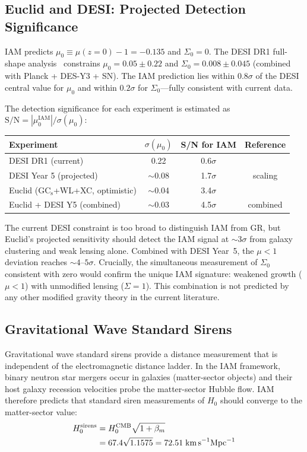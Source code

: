 \documentclass[aps,prd,twocolumn,superscriptaddress,nofootinbib]{revtex4-2}
\begin{document}
\subsection{Euclid and DESI: Projected Detection Significance}

IAM predicts $\mu_0 \equiv \mu(z=0) - 1 = -0.135$ and $\Sigma_0 = 0$. The DESI DR1 full-shape analysis~\cite{DESIDR1FS} constrains $\mu_0 = 0.05 \pm 0.22$ and $\Sigma_0 = 0.008 \pm 0.045$ (combined with Planck + DES-Y3 + SN). The IAM prediction lies within $0.8\sigma$ of the DESI central value for $\mu_0$ and within $0.2\sigma$ for $\Sigma_0$---fully consistent with current data.

The detection significance for each experiment is estimated as $\text{S/N} = |\mu_0^\text{IAM}|/\sigma(\mu_0)$:
\begin{center}
\begin{tabular}{lccc}
\hline
Experiment & $\sigma(\mu_0)$ & S/N for IAM & Reference \\
\hline
DESI DR1 (current) & 0.22 & 0.6$\sigma$ & \cite{DESIDR1FS} \\
DESI Year 5 (projected) & $\sim$0.08 & 1.7$\sigma$ & scaling \\
Euclid (GC$_\text{s}$+WL+XC, optimistic) & $\sim$0.04 & 3.4$\sigma$ & \cite{EuclidForecast2024} \\
Euclid + DESI Y5 (combined) & $\sim$0.03 & 4.5$\sigma$ & combined \\
\hline
\end{tabular}
\end{center}

The current DESI constraint is too broad to distinguish IAM from GR, but Euclid's projected sensitivity should detect the IAM signal at $\sim$3$\sigma$ from galaxy clustering and weak lensing alone. Combined with DESI Year~5, the $\mu < 1$ deviation reaches $\sim$$4$--$5\sigma$. Crucially, the simultaneous measurement of $\Sigma_0$ consistent with zero would confirm the unique IAM signature: weakened growth ($\mu < 1$) with unmodified lensing ($\Sigma = 1$). This combination is not predicted by any other modified gravity theory in the current literature.

\subsection{Gravitational Wave Standard Sirens}

Gravitational wave standard sirens provide a distance measurement that is independent of the electromagnetic distance ladder. In the IAM framework, binary neutron star mergers occur in galaxies (matter-sector objects) and their host galaxy recession velocities probe the matter-sector Hubble flow. IAM therefore predicts that standard siren measurements of $H_0$ should converge to the matter-sector value:
\begin{align}
H_0^\text{sirens} &= H_0^\text{CMB}\sqrt{1 + \beta_m} \nonumber \\
&= 67.4\sqrt{1.1575} = 72.51 \;\text{km\,s}^{-1}\text{Mpc}^{-1}
\end{align}
\end{document}
